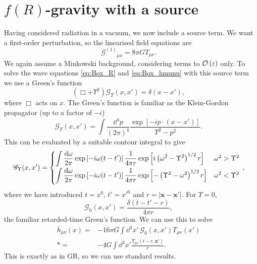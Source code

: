\section{$f(R)$-gravity with a source\label{sec:Source}}

Having considered radiation in a vacuum, we now include a source term. We want a first-order perturbation, so the linearised field equations are
\begin{equation}
{\mathcal{G}^{(1)}}_{\mu\nu} = 8\pi G T_{\mu\nu}.
\end{equation}
We again assume a Minkowski background, considering terms to $\mathcal{O}\left({\varepsilon}\right)$ only. To solve the wave equations \eqref{eq:Box_R} and \eqref{eq:Box_hmunu} with this source term we use a Green's function
\begin{equation}
\left(\Box + \Upsilon^2\right)\mathscr{G}_\Upsilon(x, x') = \delta(x - x'),
\end{equation}
where $\Box$ acts on $x$. The Green's function is familiar as the Klein-Gordon propagator (up to a factor of $-i$) \citep[section 2.4]{Peskin1995a}
\begin{equation}
\mathscr{G}_\Upsilon(x, x') = \int \frac{\dd^4 p}{(2\pi)^4} \frac{\exp\left[-ip\cdot(x-x')\right]}{\Upsilon^2 - p^2}.
\end{equation}
This can be evaluated by a suitable contour integral to give
\begin{equation}
\mathscr{G}_\Upsilon(x, x') =
\begin{cases}
{\displaystyle \int{\frac{\dd \omega}{2\pi} \exp\left[-i\omega(t-t')\right]\recip{4\pi r}\exp\left[i\left(\omega^2 - \Upsilon^2\right)^{1/2}r\right]}} & \omega^2 > \Upsilon^2\vspace{0.8mm}\\
{\displaystyle \int{\frac{\dd \omega}{2\pi} \exp\left[-i\omega(t-t')\right]\recip{4\pi r}\exp\left[-\left(\Upsilon^2 - \omega^2\right)^{1/2}r\right]}} & \omega^2 < \Upsilon^2\vspace{0.8mm}
\end{cases}\, ,
\label{eq:Green}
\end{equation}
where we have introduced $t = x^0$, $t' = x'^0$ and $r = |\boldsymbol{x} - \boldsymbol{x'}|$. For $\Upsilon = 0$,
\begin{equation}
\mathscr{G}_0(x, x') = \frac{\delta(t - t' - r)}{4 \pi r},
\end{equation}
the familiar retarded-time Green's function. We can use this to solve 
\begin{align}
\overline{h}_{\mu\nu}(x) = {} & -16 \pi G \int \dd^4 x'\, \mathscr{G}_0(x, x') T_{\mu\nu}(x') \nonumber \\*
 = {} & -4 G \int \dd^3 x' \frac{T_{\mu\nu}(t - r, \boldsymbol{x'})}{r}.
\end{align}
This is exactly as in GR, so we can use standard results.

